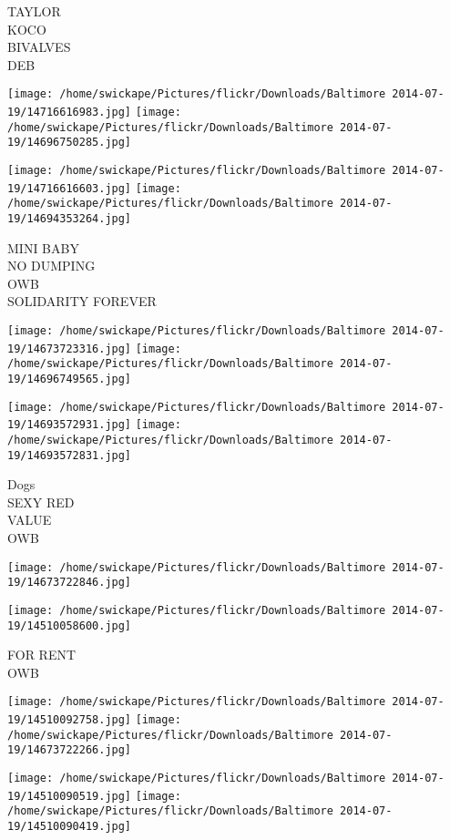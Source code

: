 \documentclass[10pt,letterpaper]{article}
\begin{document}
TAYLOR\\
KOCO\\
BIVALVES\\
DEB
\pagebreak

\texttt{[image: /home/swickape/Pictures/flickr/Downloads/Baltimore 2014-07-19/14716616983.jpg]}
\texttt{[image: /home/swickape/Pictures/flickr/Downloads/Baltimore 2014-07-19/14696750285.jpg]}

\texttt{[image: /home/swickape/Pictures/flickr/Downloads/Baltimore 2014-07-19/14716616603.jpg]}
\texttt{[image: /home/swickape/Pictures/flickr/Downloads/Baltimore 2014-07-19/14694353264.jpg]}

MINI BABY\\
NO DUMPING\\
OWB\\
SOLIDARITY FOREVER
\pagebreak

\texttt{[image: /home/swickape/Pictures/flickr/Downloads/Baltimore 2014-07-19/14673723316.jpg]}
\texttt{[image: /home/swickape/Pictures/flickr/Downloads/Baltimore 2014-07-19/14696749565.jpg]}

\texttt{[image: /home/swickape/Pictures/flickr/Downloads/Baltimore 2014-07-19/14693572931.jpg]}
\texttt{[image: /home/swickape/Pictures/flickr/Downloads/Baltimore 2014-07-19/14693572831.jpg]}

Dogs\\
SEXY RED\\
VALUE\\
OWB
\pagebreak

\texttt{[image: /home/swickape/Pictures/flickr/Downloads/Baltimore 2014-07-19/14673722846.jpg]}

\vspace{0.25in}
\texttt{[image: /home/swickape/Pictures/flickr/Downloads/Baltimore 2014-07-19/14510058600.jpg]}

FOR RENT\\
OWB
\pagebreak

\texttt{[image: /home/swickape/Pictures/flickr/Downloads/Baltimore 2014-07-19/14510092758.jpg]}
\texttt{[image: /home/swickape/Pictures/flickr/Downloads/Baltimore 2014-07-19/14673722266.jpg]}

\texttt{[image: /home/swickape/Pictures/flickr/Downloads/Baltimore 2014-07-19/14510090519.jpg]}
\texttt{[image: /home/swickape/Pictures/flickr/Downloads/Baltimore 2014-07-19/14510090419.jpg]}
\end{document}
